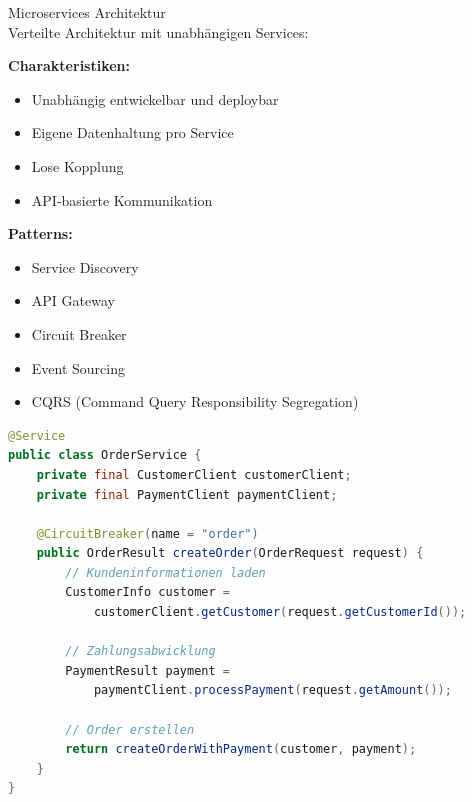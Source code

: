 \begin{concept}{Microservices Architektur}\\
Verteilte Architektur mit unabhängigen Services:

\textbf{Charakteristiken:}
\begin{itemize}
    \item Unabhängig entwickelbar und deploybar
    \item Eigene Datenhaltung pro Service
    \item Lose Kopplung
    \item API-basierte Kommunikation
\end{itemize}

\textbf{Patterns:}
\begin{itemize}
    \item Service Discovery
    \item API Gateway
    \item Circuit Breaker
    \item Event Sourcing
    \item CQRS (Command Query Responsibility Segregation)
\end{itemize}

\begin{lstlisting}[language=Java, style=basesmol]
@Service
public class OrderService {
    private final CustomerClient customerClient;
    private final PaymentClient paymentClient;
    
    @CircuitBreaker(name = "order")
    public OrderResult createOrder(OrderRequest request) {
        // Kundeninformationen laden
        CustomerInfo customer = 
            customerClient.getCustomer(request.getCustomerId());
            
        // Zahlungsabwicklung
        PaymentResult payment = 
            paymentClient.processPayment(request.getAmount());
            
        // Order erstellen
        return createOrderWithPayment(customer, payment);
    }
}
\end{lstlisting}
\end{concept}

